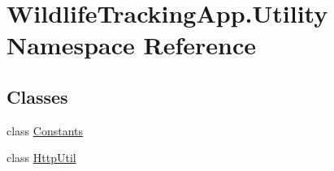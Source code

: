\hypertarget{namespaceWildlifeTrackingApp_1_1Utility}{}\section{Wildlife\+Tracking\+App.\+Utility Namespace Reference}
\label{namespaceWildlifeTrackingApp_1_1Utility}
\subsection*{Classes}
\begin{DoxyCompactItemize}
\item 
class \hyperlink{classWildlifeTrackingApp_1_1Utility_1_1Constants}{Constants}
\item 
class \hyperlink{classWildlifeTrackingApp_1_1Utility_1_1HttpUtil}{Http\+Util}
\end{DoxyCompactItemize}
